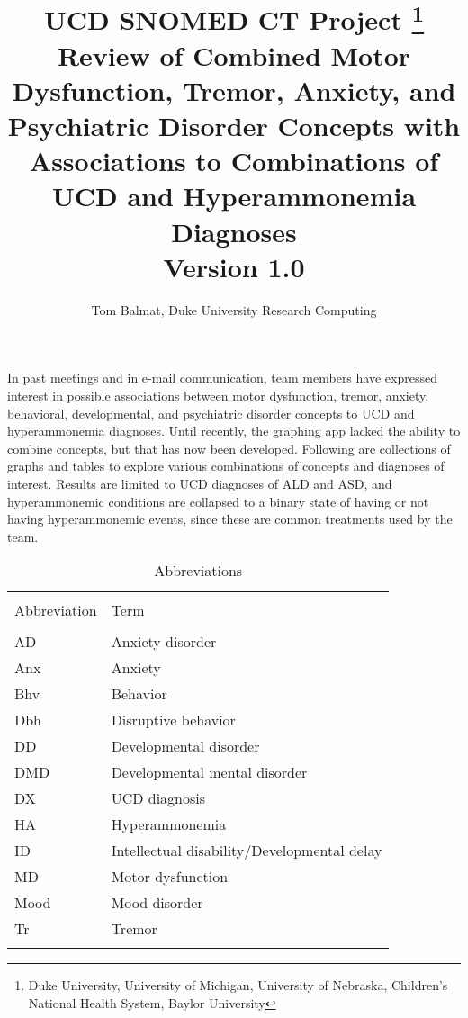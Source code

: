 \documentclass[10pt, letterpaper]{article}
\title{\Large UCD SNOMED CT Project
    \footnote{Duke University, University of Michigan, University of Nebraska, Children's National Health System, Baylor University}\\[8pt]
    \large Review of Combined Motor Dysfunction, Tremor, Anxiety, and Psychiatric Disorder Concepts with Associations to Combinations of UCD and Hyperammonemia Diagnoses\\[8pt]
    \large Version 1.0}
\date{}
\author{\normalsize Tom Balmat, Duke University Research Computing}
\begin{document}
    
\begin{spacing}{1.0}
        
\maketitle


In past meetings and in e-mail communication, team members have expressed interest in possible associations between motor dysfunction, tremor, anxiety, behavioral, developmental, and psychiatric disorder concepts to UCD and hyperammonemia diagnoses.  Until recently, the graphing app lacked the ability to combine concepts, but that has now been developed.  Following are collections of graphs and tables to explore various combinations of concepts and diagnoses of interest.  Results are limited to UCD diagnoses of ALD and ASD, and hyperammonemic conditions are collapsed to a binary state of having or not having hyperammonemic events, since these are common treatments used by the team.

\vspace{20pt}

\begin{table}[H]
    \centering
    \caption*{Abbreviations}
    \small
    \begin{tabular}{ll}
        \hline\\[-6pt]
        Abbreviation & Term \\[2pt]
        \hline\\[-6pt]
        AD & Anxiety disorder \\
        Anx & Anxiety \\
        Bhv & Behavior \\
        Dbh & Disruptive behavior \\
        DD &  Developmental disorder \\
        DMD & Developmental mental disorder \\
        DX & UCD diagnosis \\
        HA & Hyperammonemia \\
        ID & Intellectual disability/Developmental delay \\
        MD & Motor dysfunction \\
        Mood & Mood disorder \\
        Tr & Tremor \\[4pt]
        \hline\\[-4pt]
    \end{tabular}
    \label{tab:terms}
\end{table}


\end{spacing}
\end{document}

